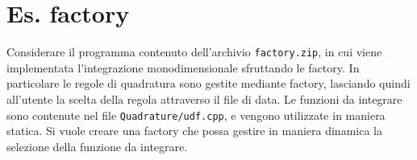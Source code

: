 \section*{Es. factory}

Considerare il programma contenuto dell'archivio \texttt{factory.zip}, in cui viene implementata l'integrazione monodimensionale sfruttando le factory. In particolare le regole di quadratura sono gestite mediante factory, lasciando quindi all'utente la scelta della regola attraverso il file di data. Le funzioni da integrare sono contenute nel file \texttt{Quadrature/udf.cpp}, e vengono utilizzate in maniera statica. Si vuole creare una factory che possa gestire in maniera dinamica la selezione della funzione da integrare.
